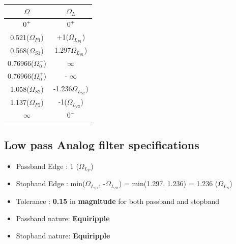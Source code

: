 \documentclass{article}
\begin{document}
\begin{table}[H]
		\begin{center}
		\begin{tabular}{|c|c|}
			\hline
			$\Omega$ & $\Omega_L$\\
			
			\hline
                $0^+$ & $0^+$\\
                \hline
                0.521($\Omega_{P1}$) & +1($\Omega_{L_{P1}}$) \\
                \hline
                0.568($\Omega_{S1}$) & 1.297$\Omega_{L_{S1}}$)\\
                \hline
                0.76966($\Omega_0^-$) & $\infty$\\
                \hline
                0.76966($\Omega_0^+$) & - $\infty$\\
                \hline
                1.058($\Omega_{S2}$) & -1.236$\Omega_{L_{S2}}$)\\
                \hline
                1.137($\Omega_{P2}$) & -1($\Omega_{L_{P2}}$)\\
                \hline
                $\infty$ & $0^-$\\
                \hline
            
		\end{tabular}
		\end{center}
\end{table}

\subsection{Low pass Analog filter specifications}

\begin{itemize}
    \item Passband Edge : 1 ($\Omega_{L_{P}}$)
    \item Stopband Edge : min($\Omega_{L_{S1}}$, -$\Omega_{L_{S2}}$) = min(1.297, 1.236) = 1.236 ($\Omega_{L_{S}}$)
    \item  Tolerance : \textbf{0.15} in \textbf{magnitude} for both passband and stopband
    \item Passband nature: \textbf{Equiripple}
    \item Stopband nature: \textbf{Equiripple}
\end{itemize}
\end{document}

